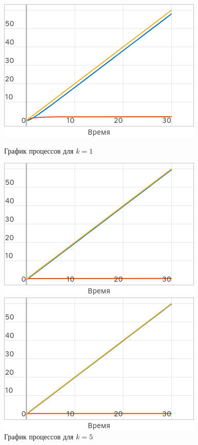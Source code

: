 \documentclass[a4paper]{article}
\begin{document}
\begin{figure}[H]
    \centering
    \begin{minipage}{0.32\textwidth}
        \includegraphics[width=\textwidth]{sources/task2_Vt_k=1.png}
        \caption*{График процессов для $k = 1$}
    \end{minipage}
    \hfill
    \begin{minipage}{0.32\textwidth}
        \includegraphics[width=\textwidth]{sources/task2_Vt_k=5.png}
        \caption*{График процессов для $k = 5$}
    \end{minipage}
    \hfill
    \begin{minipage}{0.32\textwidth}
        \includegraphics[width=\textwidth]{sources/task2_Vt_k=10.png}

\end{minipage}
\end{figure}
\end{document}

